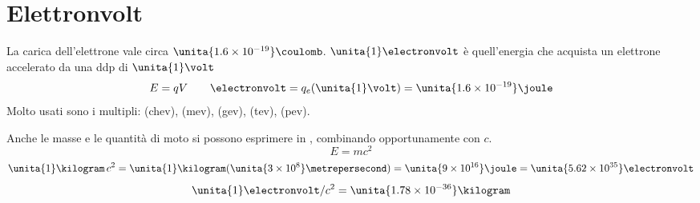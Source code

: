 \section{Elettronvolt}
La carica dell'elettrone vale circa $\unita{1.6\times 10^{-19}}\coulomb$. $\unita{1}\electronvolt$ è quell'energia che acquista un elettrone accelerato da una ddp di $\unita{1}\volt$
\begin{equation*}
E=qV\qquad \electronvolt=q_e(\unita{1}\volt)=\unita{1.6\times 10^{-19}}\joule
\end{equation*}
Molto usati sono i multipli: \kilo\electronvolt (chev), \mega\electronvolt (mev), \giga\electronvolt (gev), \tera\electronvolt (tev), \peta\electronvolt (pev).

Anche le masse e le quantità di moto si possono esprimere in \electronvolt, combinando opportunamente con $c$.
\begin{equation*}E=mc^2\end{equation*}
\begin{equation*}\unita{1}\kilogram\,c^2=\unita{1}\kilogram(\unita{3\times 10^8}\metrepersecond)=\unita{9\times 10^{16}}\joule=\unita{5.62\times 10^{35}}\electronvolt\end{equation*}
\begin{equation*}\unita{1}\electronvolt/c^2=\unita{1.78\times 10^{-36}}\kilogram\end{equation*}
